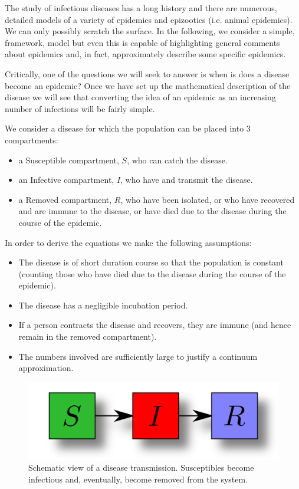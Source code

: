 The study of infectious diseases has a long history and there are numerous, detailed models of a variety of epidemics and epizootics (i.e. animal epidemics). We can only possibly scratch the surface. In the following, we  consider a simple, framework, model but even this is  capable of highlighting general comments about epidemics and, in fact, approximately describe some specific epidemics.

Critically, one of the questions we will seek to answer is when is does a disease become an epidemic? Once we have set up the mathematical description of the disease we will see that converting the idea of an epidemic as an increasing number of infections will be fairly simple.


We consider a disease for which the population can be placed into 3 compartments:
\begin{itemize}
\item a Susceptible compartment, $S$, who can catch the disease.
\item an Infective compartment, $I$, who have and transmit the disease.
\item a Removed compartment, $R$, who have been isolated, or who have
recovered and are immune to the disease, or have died due to the
disease during the course of the epidemic.
\end{itemize}
In order to derive the equations we make the following assumptions:
\begin{itemize}
\item The disease is of short duration course so that the population is constant (counting those who have died due to the disease during the course of the epidemic).
\item The disease has a negligible incubation period.
\item If a person contracts the disease and recovers, they are immune (and hence remain in the removed compartment).
\item The numbers involved are sufficiently large to justify a continuum approximation.
\end{itemize}

\begin{figure}[h!!!tb]
\includegraphics[width=\textwidth]{../Pictures/SIR.png}
\caption{Schematic view of a disease transmission. Susceptibles become infectious and, eventually, become removed from the system.}
\end{figure}

